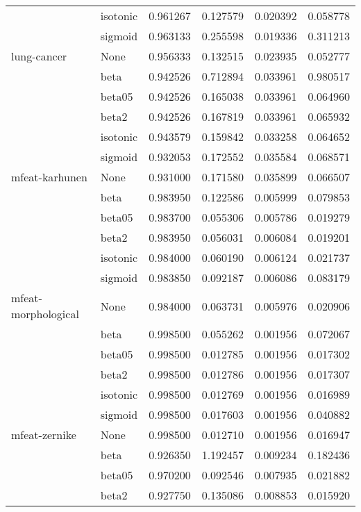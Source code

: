 \begin{tabular}{llrrrr}
        & isotonic &  0.961267 &   0.127579 &  0.020392 &  0.058778 \\
        & sigmoid &  0.963133 &   0.255598 &  0.019336 &  0.311213 \\
lung-cancer & None &  0.956333 &   0.132515 &  0.023935 &  0.052777 \\
        & beta &  0.942526 &   0.712894 &  0.033961 &  0.980517 \\
        & beta05 &  0.942526 &   0.165038 &  0.033961 &  0.064960 \\
        & beta2 &  0.942526 &   0.167819 &  0.033961 &  0.065932 \\
        & isotonic &  0.943579 &   0.159842 &  0.033258 &  0.064652 \\
        & sigmoid &  0.932053 &   0.172552 &  0.035584 &  0.068571 \\
mfeat-karhunen & None &  0.931000 &   0.171580 &  0.035899 &  0.066507 \\
        & beta &  0.983950 &   0.122586 &  0.005999 &  0.079853 \\
        & beta05 &  0.983700 &   0.055306 &  0.005786 &  0.019279 \\
        & beta2 &  0.983950 &   0.056031 &  0.006084 &  0.019201 \\
        & isotonic &  0.984000 &   0.060190 &  0.006124 &  0.021737 \\
        & sigmoid &  0.983850 &   0.092187 &  0.006086 &  0.083179 \\
mfeat-morphological & None &  0.984000 &   0.063731 &  0.005976 &  0.020906 \\
        & beta &  0.998500 &   0.055262 &  0.001956 &  0.072067 \\
        & beta05 &  0.998500 &   0.012785 &  0.001956 &  0.017302 \\
        & beta2 &  0.998500 &   0.012786 &  0.001956 &  0.017307 \\
        & isotonic &  0.998500 &   0.012769 &  0.001956 &  0.016989 \\
        & sigmoid &  0.998500 &   0.017603 &  0.001956 &  0.040882 \\
mfeat-zernike & None &  0.998500 &   0.012710 &  0.001956 &  0.016947 \\
        & beta &  0.926350 &   1.192457 &  0.009234 &  0.182436 \\
        & beta05 &  0.970200 &   0.092546 &  0.007935 &  0.021882 \\
        & beta2 &  0.927750 &   0.135086 &  0.008853 &  0.015920 \\

\end{tabular}
